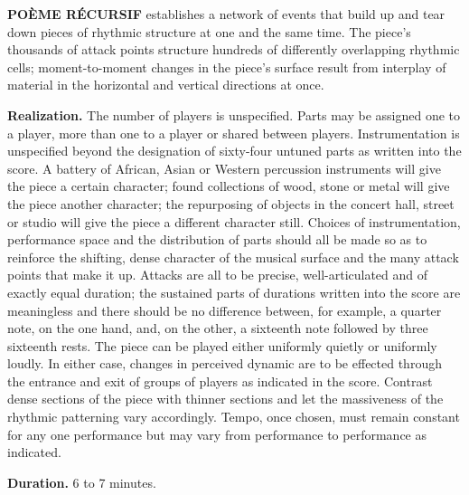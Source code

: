 \textbf{POÈME RÉCURSIF} establishes a network of events that build up and tear
down pieces of rhythmic structure at one and the same time. The piece's
thousands of attack points structure hundreds of differently overlapping
rhythmic cells; moment-to-moment changes in the piece's surface result from
interplay of material in the horizontal and vertical directions at once.

\textbf{Realization.} The number of players is unspecified. Parts may be
assigned one to a player, more than one to a player or shared between players.
Instrumentation is unspecified beyond the designation of sixty-four untuned
parts as written into the score. A battery of African, Asian or Western
percussion instruments will give the piece a certain character; found
collections of wood, stone or metal will give the piece another character; the
repurposing of objects in the concert hall, street or studio will give the
piece a different character still. Choices of instrumentation, performance
space and the distribution of parts should all be made so as to reinforce the
shifting, dense character of the musical surface and the many attack points
that make it up. Attacks are all to be precise, well-articulated and of exactly
equal duration; the sustained parts of durations written into the score are
meaningless and there should be no difference between, for example, a quarter
note, on the one hand, and, on the other, a sixteenth note followed by three
sixteenth rests. The piece can be played either uniformly quietly or uniformly
loudly. In either case, changes in perceived dynamic are to be effected through
the entrance and exit of groups of players as indicated in the score. Contrast
dense sections of the piece with thinner sections and let the massiveness of
the rhythmic patterning vary accordingly. Tempo, once chosen, must remain
constant for any one performance but may vary from performance to performance
as indicated.

\textbf{Duration.} 6 to 7 minutes.

